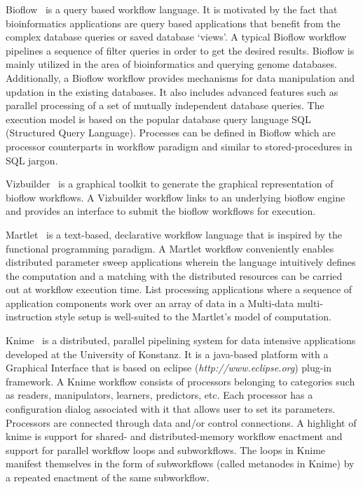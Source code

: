 %
Bioflow~\cite{bioflow} is a query based workflow language.
It is motivated by the fact that bioinformatics applications are query based
applications that benefit from the complex database queries or saved database
`views'. A typical Bioflow workflow pipelines a sequence of filter queries in
order to get the desired results. Bioflow is mainly utilized in the area of
bioinformatics and querying genome databases. Additionally, a Bioflow workflow
provides mechanisms for data manipulation and updation in the existing
databases. It also includes advanced features such as parallel processing of a
set of mutually independent database queries. The execution model is based on
the popular database query language SQL (Structured Query Language). Processes
can be defined in Bioflow which are processor counterparts in workflow paradigm
and similar to stored-procedures in SQL jargon.

%
Vizbuilder~\cite{vizbuilder} is a graphical toolkit to generate the graphical
representation of bioflow workflows. A Vizbuilder workflow links to an
underlying bioflow engine and provides an interface to submit the bioflow
workflows for execution.

%
Martlet~\cite{martlet} is a text-based, declarative
workflow language that is inspired by the functional programming paradigm. A
Martlet workflow conveniently enables distributed parameter sweep applications
wherein the language intuitively defines the computation and a matching with
the distributed resources can be carried out at workflow execution time. List
processing applications where a sequence of application components work over an
array of data in a Multi-data multi-instruction style setup is well-suited to
the Martlet's model of computation.

%
Knime~\cite{knime} is a distributed, parallel pipelining
system for data intensive applications developed at the University of Konstanz.
It is a java-based platform with a Graphical Interface that is based on eclipse
(\textit{http://www.eclipse.org}) plug-in framework. A Knime workflow consists
of processors belonging to categories such as readers, manipulators, learners,
predictors, etc. Each processor has a configuration dialog associated with it
that allows user to set its parameters. Processors are connected through data
and/or control connections. A highlight of knime is support for shared- and
distributed-memory workflow enactment and support for parallel workflow loops
and subworkflows. The loops in Knime manifest themselves in the form of
subworkflows (called metanodes in Knime) by a repeated enactment of the same
subworkflow.

